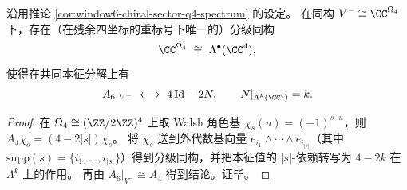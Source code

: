 \begin{proposition}\label{prop:window6-chiral-exterior-algebra-degree-operator}
沿用推论 \ref{cor:window6-chiral-sector-q4-spectrum} 的设定。
在同构 \(V^-\cong \CC^{\Omega_4}\) 下，存在（在残余四坐标的重标号下唯一的）分级同构
\[
\CC^{\Omega_4}\ \cong\ \Lambda^\bullet(\CC^4),
\]
使得在共同本征分解上有
\[
A_6|_{V^-}\ \longleftrightarrow\ 4\,\mathrm{Id}-2N,
\qquad
N|_{\Lambda^k(\CC^4)}=k.
\]
\end{proposition}
\begin{proof}
在 \(\Omega_4\cong(\ZZ/2\ZZ)^4\) 上取 Walsh 角色基 \(\chi_s(u)=(-1)^{s\cdot u}\)，则 \(A_4\chi_s=(4-2|s|)\chi_s\)。
将 \(\chi_s\) 送到外代数基向量 \(e_{i_1}\wedge\cdots\wedge e_{i_{|s|}}\)（其中 \(\mathrm{supp}(s)=\{i_1,\dots,i_{|s|}\}\)）得到分级同构，并把本征值的 \(|s|\)-依赖转写为 \(4-2k\) 在 \(\Lambda^k\) 上的作用。
再由 \(A_6|_{V^-}\cong A_4\) 得到结论。证毕。
\end{proof}

